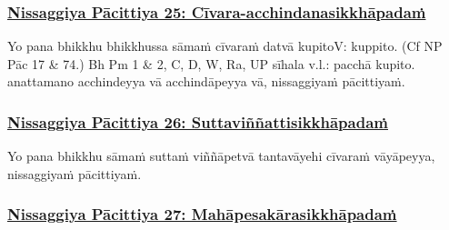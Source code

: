 \subsubsection*{\hyperref[forf-exp25]{Nissaggiya Pācittiya 25: Cīvara-acchindanasikkhāpadaṁ}}
\label{np25}

Yo pana bhikkhu bhikkhussa sāmaṁ cīvaraṁ datvā kupito\makeatletter\hyperlink{endnote-appendix}\makeatother V: kuppito. (Cf NP Pāc 17 & 74.)
Bh Pm 1 & 2, C, D, W, Ra, UP sīhala v.l.: pacchā kupito.  anattamano acchindeyya vā acchindāpeyya vā, nissaggiyaṁ pācittiyaṁ.



\subsubsection*{\hyperref[forf-exp26]{Nissaggiya Pācittiya 26: Suttaviññattisikkhāpadaṁ}}
\label{np26}

Yo pana bhikkhu sāmaṁ suttaṁ viññāpetvā tantavāyehi cīvaraṁ vāyāpeyya, nissaggiyaṁ pācittiyaṁ.



\subsubsection*{\hyperref[forf-exp27]{Nissaggiya Pācittiya 27: Mahāpesakārasikkhāpadaṁ}}
\label{np27}

